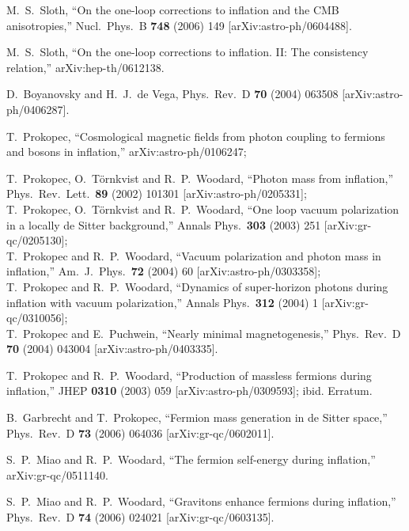 \documentclass[aps,12pt,superscriptaddress,preprintnumbers,
                secnumarabic,nofootinbib,showpacs]{revtex4}
\begin{document}
\begin{thebibliography}{999}
  M.~S.~Sloth,
  ``On the one-loop corrections to inflation and the CMB anisotropies,''
  Nucl.\ Phys.\  B {\bf 748} (2006) 149
  [arXiv:astro-ph/0604488].

  M.~S.~Sloth,
  ``On the one-loop corrections to inflation. II: The consistency relation,''
  arXiv:hep-th/0612138.

  D.~Boyanovsky and H.~J.~de Vega,
  Phys.\ Rev.\  D {\bf 70} (2004) 063508
  [arXiv:astro-ph/0406287].

 T.~Prokopec,
  ``Cosmological magnetic fields from photon coupling to fermions and  bosons
  in inflation,''
  arXiv:astro-ph/0106247;

  T.~Prokopec, O.~T\"ornkvist and R.~P.~Woodard,
  ``Photon mass from inflation,''
  Phys.\ Rev.\ Lett.\  {\bf 89} (2002) 101301
  [arXiv:astro-ph/0205331];
\\
  T.~Prokopec, O.~T\"ornkvist and R.~P.~Woodard,
  ``One loop vacuum polarization in a locally de Sitter background,''
  Annals Phys.\  {\bf 303} (2003) 251
  [arXiv:gr-qc/0205130];
\\
  T.~Prokopec and R.~P.~Woodard,
  ``Vacuum polarization and photon mass in inflation,''
  Am.\ J.\ Phys.\  {\bf 72} (2004) 60
  [arXiv:astro-ph/0303358];
\\
  T.~Prokopec and R.~P.~Woodard,
  ``Dynamics of super-horizon photons during inflation with vacuum
  polarization,''
  Annals Phys.\  {\bf 312} (2004) 1
  [arXiv:gr-qc/0310056];
\\
  T.~Prokopec and E.~Puchwein,
  ``Nearly minimal magnetogenesis,''
  Phys.\ Rev.\ D {\bf 70} (2004) 043004
  [arXiv:astro-ph/0403335].

  T.~Prokopec and R.~P.~Woodard,
  ``Production of massless fermions during inflation,''
  JHEP {\bf 0310} (2003) 059
  [arXiv:astro-ph/0309593];
  ibid. Erratum.

  B.~Garbrecht and T.~Prokopec,
  ``Fermion mass generation in de Sitter space,''
  Phys.\ Rev.\  D {\bf 73} (2006) 064036
  [arXiv:gr-qc/0602011].

  S.~P.~Miao and R.~P.~Woodard,
  ``The fermion self-energy during inflation,''
  arXiv:gr-qc/0511140.

  S.~P.~Miao and R.~P.~Woodard,
  ``Gravitons enhance fermions during inflation,''
  Phys.\ Rev.\  D {\bf 74} (2006) 024021
  [arXiv:gr-qc/0603135].


\end{thebibliography}
\end{document}
